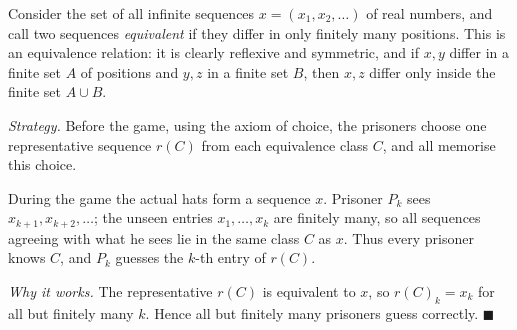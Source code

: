 Consider the set of all infinite sequences $x=(x_1,x_2,\ldots)$ of real numbers, and call two sequences \emph{equivalent} if they differ in only finitely many positions. This is an equivalence relation: it is clearly reflexive and symmetric, and if $x,y$ differ in a finite set $A$ of positions and $y,z$ in a finite set $B$, then $x,z$ differ only inside the finite set $A\cup B$.

\emph{Strategy.} Before the game, using the axiom of choice, the prisoners choose one representative sequence $r(C)$ from each equivalence class $C$, and all memorise this choice.

During the game the actual hats form a sequence $x$. Prisoner $P_k$ sees $x_{k+1},x_{k+2},\ldots$; the unseen entries $x_1,\ldots,x_k$ are finitely many, so all sequences agreeing with what he sees lie in the same class $C$ as $x$. Thus every prisoner knows $C$, and $P_k$ guesses the $k$-th entry of $r(C)$.

\emph{Why it works.} The representative $r(C)$ is equivalent to $x$, so $r(C)_k=x_k$ for all but finitely many $k$. Hence all but finitely many prisoners guess correctly. $\blacksquare$
